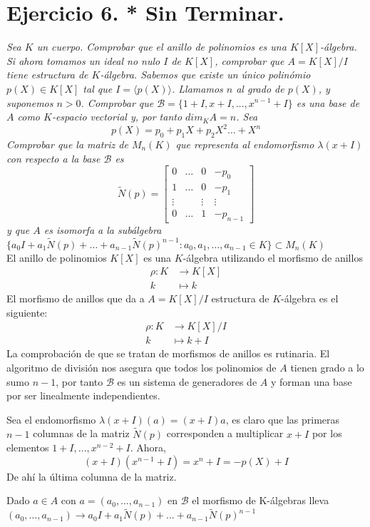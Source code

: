 \section{Ejercicio 6. * Sin Terminar.} \emph{Sea \(K\) un cuerpo. Comprobar que el anillo de polinomios
es una \(K[X]\)-álgebra. Si ahora tomamos un ideal no nulo \(I\) de
\(K[X]\), comprobar que \(A = K[X]/I\) tiene estructura de
\(K\)-álgebra. Sabemos que existe un único polinómio \(p(X) \in K[X]\) tal que
\(I = \langle p(X) \rangle\). Llamamos \(n\) al grado de \(p(X)\), y suponemos
\(n > 0\). Comprobar que \(\mathcal{B} = \{1 + I, x + I, \dots, x^{n-1} + I\}\)
es una base de \(A\) como \(K\)-espacio vectorial y, por tanto \(dim_KA = n\).
Sea}
\[
p(X) = p_0 + p_1X + p_2X^2\dots + X^n
\]
\emph{Comprobar que la matriz de \(M_n(K)\) que representa al endomorfismo \(\lambda(x
+ I)\) con respecto a la base \(\mathcal{B}\) es}
\[
\tilde{N}(p) = \begin{bmatrix}
    0       &  \dots  & 0 & -p_0 \\
    1       &  \dots  & 0 & -p_1 \\
    \vdots &  & \vdots & \vdots \\
    0       &  \dots  & 1 & -p_{n-1}
\end{bmatrix}
\]
\emph{y que \(A\) es isomorfa a la subálgebra \(\{a_0I + a_1\tilde{N}(p) + \dots +
  a_{n-1}\tilde{N}(p)^{n-1} : a_0, a_1, \dots, a_{n-1} \in K\} \subset M_n(K)\)}\\

El anillo de polinomios \(K[X]\) es una \(K\)-álgebra utilizando el morfismo de
anillos
\[
\begin{aligned}
  \rho: K &\to K[X]\\
        k &\mapsto k
\end{aligned}
\]
El morfismo de anillos que da a \(A = K[X]/I\) estructura de \(K\)-álgebra es el
siguiente:
\[
\begin{aligned}
  \rho: K &\to K[X]/I \\
  k &\mapsto k + I
\end{aligned}
\]
La comprobación de que se tratan de morfismos de anillos es rutinaria.
El algoritmo de división nos asegura que todos los polinomios de \(A\) tienen
grado a lo sumo \(n-1\), por tanto \(\mathcal{B}\) es un sistema de generadores
de \(A\) y forman una base por ser linealmente independientes.

Sea el endomorfismo \(\lambda (x+I)(a) = (x+I)a\), es claro que las primeras
\(n-1\) columnas de la matriz \(\tilde{N}(p)\) corresponden a multiplicar \(x +
I\) por los elementos \(1 + I, \dots, x^{n-2} + I\). Ahora,
\[
(x + I)(x^{n-1} + I) = x^n + I = -p(X) + I
\]
De ahí la última columna de la matriz.

Dado \(a \in A\) con \(a = (a_0, \dots, a_{n-1})\) en \(\mathcal{B}\) el
morfismo de K-álgebras lleva \((a_0,\dots,a_{n-1}) \to a_0I + a_1\tilde{N}(p) + \dots +
  a_{n-1}\tilde{N}(p)^{n-1} \)

